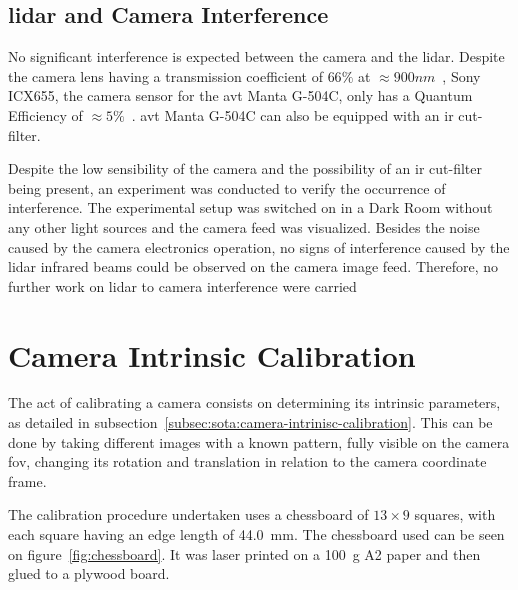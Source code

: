 \subsection{\ac{lidar} and Camera Interference}
No significant interference is expected between the camera and the \ac{lidar}. Despite the camera lens having a transmission coefficient of $66\%$ at $\approx 900 nm$~\cite{Thorlabs}, Sony ICX655, the camera sensor for the \ac{avt} Manta G-504C, only has a Quantum Efficiency of $\approx 5\%$~\cite{MantaG504C}. \ac{avt} Manta G-504C can also be equipped with an \ac{ir} cut-filter.

Despite the low sensibility of the camera and the possibility of an \ac{ir} cut-filter being present, an experiment was conducted to verify the occurrence of interference. The experimental setup was switched on in a Dark Room without any other light sources and the camera feed was visualized. Besides the noise caused by the camera electronics operation, no signs of interference caused by the \ac{lidar} infrared beams could be observed on the camera image feed. Therefore, no further work on \ac{lidar} to camera interference were carried





\section{Camera Intrinsic Calibration}
\label{sec:calibration:camera}
The act of calibrating a camera consists on determining its intrinsic parameters, as detailed in subsection~\ref{subsec:sota:camera-intrinisc-calibration}. This can be done by taking different images with a known pattern, fully visible on the camera \ac{fov}, changing its rotation and translation in relation to the camera coordinate frame.

The calibration procedure undertaken uses a chessboard of $13 \times 9$ squares, with each square having an edge length of \SI{44.0}{\milli\meter}. The chessboard used can be seen on figure~\ref{fig:chessboard}. It was laser printed on a \SI{100}{\gram} A2 paper and then glued to a plywood board.

